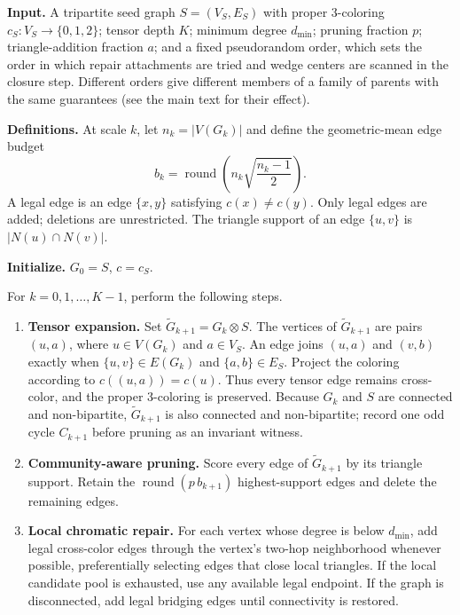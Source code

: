 \documentclass[12pt]{article}
\begin{document}
\begin{tcolorbox}[
breakable, colback=white, colframe=black, boxrule=0.5pt, arc=0pt,
left=6pt, right=6pt, top=6pt, bottom=6pt,
title={Algorithm 1A: Parent construction by local repair}
]
\small

\textbf{Input.}
A tripartite seed graph \(S=(V_S,E_S)\) with proper 3-coloring
\(c_S:V_S\to\{0,1,2\}\); tensor depth \(K\); minimum degree \(d_{\min}\);
pruning fraction \(p\); triangle-addition fraction \(a\); and a fixed
pseudorandom order, which sets the order in which repair attachments are
tried and wedge centers are scanned in the closure step.  Different orders
give different members of a family of parents with the same guarantees (see
the main text for their effect).


\medskip
\textbf{Definitions.}
At scale \(k\), let \(n_k=|V(G_k)|\) and define the geometric-mean edge budget
\[
b_k
=
\operatorname{round}\!\left(
n_k\sqrt{\frac{n_k-1}{2}}
\right).
\]
A legal edge is an edge \(\{x,y\}\) satisfying \(c(x)\ne c(y)\).  Only legal
edges are added; deletions are unrestricted.  The triangle support of an
edge \(\{u,v\}\) is \(|N(u)\cap N(v)|\).

\medskip
\textbf{Initialize.}
\(G_0=S\), \(c=c_S\).

\medskip
For \(k=0,1,\ldots,K-1\), perform the following steps.

\begin{enumerate}

\item \textbf{Tensor expansion.}
Set \(\widetilde G_{k+1}=G_k\otimes S\).  The vertices of
\(\widetilde G_{k+1}\) are pairs \((u,a)\), where \(u\in V(G_k)\) and
\(a\in V_S\).  An edge joins \((u,a)\) and \((v,b)\) exactly when
\(\{u,v\}\in E(G_k)\) and \(\{a,b\}\in E_S\).  Project the coloring
according to \(c((u,a))=c(u)\).  Thus every tensor edge remains cross-color,
and the proper 3-coloring is preserved.  Because $G_k$ and $S$ are connected
and non-bipartite, $\widetilde G_{k+1}$ is also connected and non-bipartite;
record one odd cycle $C_{k+1}$ before pruning as an invariant witness.

\item \textbf{Community-aware pruning.}
Score every edge of \(\widetilde G_{k+1}\) by its triangle support.  Retain
the \(\operatorname{round}(p\,b_{k+1})\) highest-support edges and delete the
remaining edges.

\item \textbf{Local chromatic repair.}
For each vertex whose degree is below \(d_{\min}\), add legal cross-color
edges through the vertex's two-hop neighborhood whenever possible,
preferentially selecting edges that close local triangles.  If the local
candidate pool is exhausted, use any available legal endpoint.  If the graph
is disconnected, add legal bridging edges until connectivity is restored.


\end{enumerate}
\end{tcolorbox}
\end{document}
